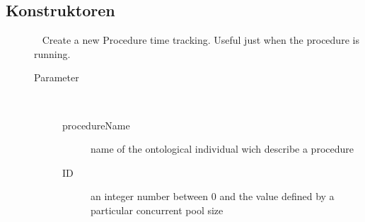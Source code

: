 \subsection{Konstruktoren}
\begin{description}
\item[{\label{ontologyFramework.OFProcedureManagment.ProcedureConcurrenceData(java.lang.String,java.lang.Integer)}}]
~ Create a new Procedure time tracking. Useful just when
 the procedure is running.
\begin{description}
\item[Parameter] ~
\begin{description}
\item[procedureName]
name of the ontological individual 
 wich describe a procedure
\item[ID]
an integer number between 0 and the value defined 
 by a particular concurrent pool size
\end{description}
\end{description}
\end{description}

